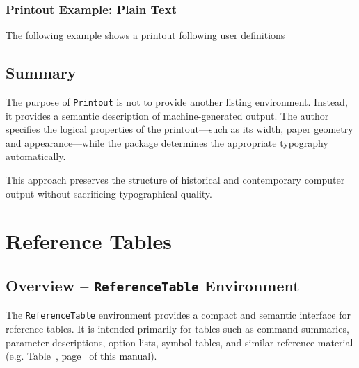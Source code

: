 \documentclass[
11pt,
a4paper,
oneside
]{scrbook}
\begin{document}







\subsection{Printout Example: Plain Text}
The following example shows a printout following user definitions 








	
\section{Summary}
The purpose of \texttt{Printout} is not to provide another listing
environment.
Instead, it provides a semantic description of machine-generated output.
The author specifies the logical properties of the printout---such as
its width, paper geometry and appearance---while the package determines
the appropriate typography automatically.

This approach preserves the structure of historical and contemporary
computer output without sacrificing typographical quality. 

\chapter{Reference Tables}
\label{chap:ReferenceTables}
\begin{center}
	\vspace{-10ex}
\end{center}
\section{Overview -- \texttt{ReferenceTable} Environment}

The \texttt{ReferenceTable} environment provides a compact and semantic
interface for reference tables. It is intended primarily for tables such as
command summaries, parameter descriptions, option lists, symbol tables, and
similar reference material (e.g. Table~, 
page~ of this manual).
\end{document}
